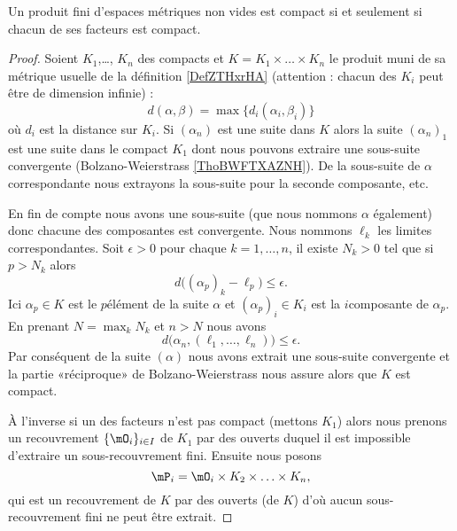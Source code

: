 \begin{theorem}\label{PropIYmxXuu}
    Un produit fini d'espaces métriques non vides est compact si et seulement si chacun de ses facteurs est compact.
\end{theorem}

\begin{proof}
    Soient \( K_1\),\ldots, \( K_n\) des compacts et \( K=K_1\times \ldots\times K_n\) le produit muni de sa métrique usuelle de la définition \eqref{DefZTHxrHA} (attention : chacun des \( K_i\) peut être de dimension infinie) :
    \begin{equation}
        d(\alpha,\beta)=\max\{ d_i(\alpha_i,\beta_i) \}
    \end{equation}
    où \( d_i\) est la distance sur \( K_i\). Si \( (\alpha_n)\) est une suite dans \( K\) alors la suite \( (\alpha_n)_1\) est une suite dans le compact \( K_1\) dont nous pouvons extraire une sous-suite convergente (Bolzano-Weierstrass \ref{ThoBWFTXAZNH}). De la sous-suite de \( \alpha\) correspondante nous extrayons la sous-suite pour la seconde composante, etc.

    En fin de compte nous avons une sous-suite (que nous nommons \( \alpha\) également) donc chacune des composantes est convergente. Nous nommons \( \ell_k\) les limites correspondantes. Soit \( \epsilon>0\) pour chaque \( k=1,\ldots, n\), il existe \( N_k>0\) tel que si \( p>N_k\) alors
    \begin{equation}
        d\big( (\alpha_p)_k-\ell_p \big)\leq \epsilon.
    \end{equation}
    Ici \( \alpha_p\in K\) est le \( p\)\ieme élément de la suite \( \alpha\) et \( (\alpha_p)_i\in K_i\) est la \( i\)\ieme composante de \( \alpha_p\). En prenant \( N=\max_kN_k\) et \( n>N\) nous avons
    \begin{equation}
        d\big( \alpha_n,(\ell_1,\ldots, \ell_n) \big)\leq\epsilon.
    \end{equation}
    Par conséquent de la suite \( (\alpha)\) nous avons extrait une sous-suite convergente et la partie «réciproque» de Bolzano-Weierstrass nous assure alors que \( K\) est compact.

    À l'inverse si un des facteurs n'est pas compact (mettons \( K_1\)) alors nous prenons un recouvrement \( \{ \mO_i \}_{i\in I}\) de \( K_1\) par des ouverts duquel il est impossible d'extraire un sous-recouvrement fini. Ensuite nous posons
    \begin{equation}
        \mP_i=\mO_i\times K_2\times\ldots\times K_n,
    \end{equation}
    qui est un recouvrement de \( K\) par des ouverts (de \( K\)) d'où aucun sous-recouvrement fini ne peut être extrait.
\end{proof}

